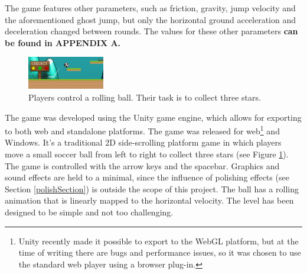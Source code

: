 The game features other parameters, such as friction, gravity, jump velocity and the aforementioned ghost jump, but only the horizontal ground acceleration and deceleration changed between rounds. The values for these other parameters \textbf{can be found in APPENDIX A.}

\begin{figure}[htbp]
\centering
\includegraphics[width=0.3\textwidth]{Pics/gf}
\caption{Players control a rolling ball. Their task is to collect three stars.}
\label{fig:game}
\end{figure}

The game was developed using the Unity game engine, which allows for exporting to both web and standalone platforms. The game was released for web\footnote{Unity recently made it possible to export to the WebGL platform, but at the time of writing there are bugs and performance issues, so it was chosen to use the standard web player using a browser plug-in.} and Windows. It's a traditional 2D side-scrolling platform game in which players move a small soccer ball from left to right to collect three stars (see Figure \ref{fig:game}). The game is controlled with the arrow keys and the spacebar. Graphics and sound effects are held to a minimal, since the influence of polishing effects (see Section \ref{polishSection}) is outside the scope of this project. The ball has a rolling animation that is linearly mapped to the horizontal velocity. The level has been designed to be simple and not too challenging.
